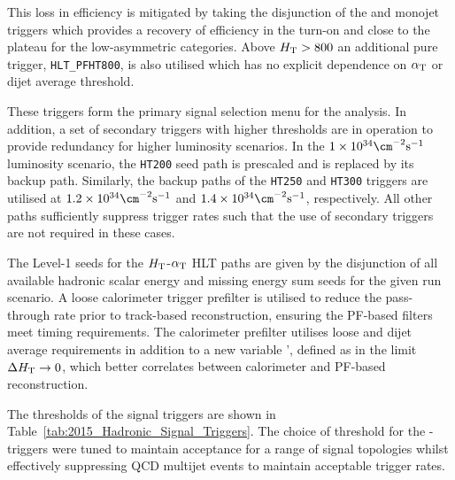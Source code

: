 This loss in efficiency is mitigated by taking the 
disjunction of the \alt and monojet triggers which provides a recovery 
of efficiency in the turn-on and close to the plateau for the low-\scalht asymmetric categories. 
Above $\mbox{$H_\text{T}$} > 800$ \GeV an additional pure \scalht trigger, \verb!HLT_PFHT800!, 
is also utilised which has no explicit dependence on $\alpha_{\text{T}}$ or dijet average threshold. 

These triggers form the primary signal selection menu for the analysis. In
addition, a set of secondary triggers with higher thresholds are in operation 
to provide redundancy for higher luminosity scenarios. In the $1\times10^{34}\cm^{-2}{\rm s}^{-1}$
luminosity scenario, the \verb!HT200! \alphat seed path is prescaled and is replaced by
its backup path. Similarly, the backup paths of the \verb!HT250! and \verb!HT300!
triggers are utilised at $1.2\times10^{34}\cm^{-2}{\rm s}^{-1}$ and
$1.4\times10^{34}\cm^{-2}{\rm s}^{-1}$, respectively. All other \alphat
paths sufficiently suppress trigger rates such that the use of secondary triggers 
are not required in these cases.

The Level-1 seeds for the $\mbox{$H_\text{T}$}$-$\alpha_{\text{T}}$ HLT paths are given by the
disjunction of all available hadronic scalar energy and missing energy sum seeds for 
the given run scenario. A loose calorimeter trigger prefilter is utilised to reduce the pass-through 
rate prior to track-based reconstruction, ensuring the PF-based filters meet timing requirements. The calorimeter prefilter 
utilises loose \scalht and dijet average \pt requirements in addition to a new variable \alphat', 
defined as \alphat in the limit $\Delta\mbox{$H_\text{T}$} \rightarrow 0$, which better correlates \alphat 
between calorimeter and PF-based reconstruction. 

The thresholds of the signal triggers are shown in Table~\ref{tab:2015_Hadronic_Signal_Triggers}. The choice of threshold for 
the \scalht-\alphat triggers were tuned to maintain acceptance for a range of signal topologies whilst effectively suppressing QCD 
multijet events to maintain acceptable trigger rates. 



